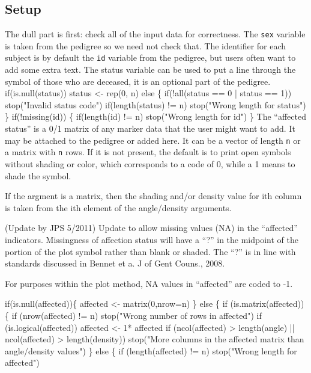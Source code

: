 \documentclass{article}
\begin{document}
\begin{enumerate}
\subsection{Setup}
The dull part is first: check all of the input data for
correctness.  
The {\tt{}sex} variable is taken from the pedigree so we need not check
that. 
The identifier for each subject is by default the {\tt{}id} variable from
the pedigree, but users often want to add some extra text.
The status variable can be used to put a line through the symbol
of those who are deceased, it is an optional part of the pedigree.
\nwenddocs{}\endmoddef
if(is.null(status))
  status <- rep(0, n)
else \{
    if(!all(status == 0 | status == 1))
      stop("Invalid status code")
    if(length(status) != n)
      stop("Wrong length for status")
\}
if(!missing(id)) \{
    if(length(id) != n)
      stop("Wrong length for id")
\}
\nwendcode{}\nwdocspar
The ``affected status'' is a 0/1 matrix of any marker data that the
user might want to add.  It may be attached to the pedigree or added
here.  It can be a vector of length {\tt{}n} or a matrix with {\tt{}n} rows.
If it is not present, the default is to print open symbols without
shading or color, which corresponds to a code of 0, while a 1 means to
shade the symbol.  

If the argment is a matrix, then the shading and/or density value for
ith column is taken from the ith element of the angle/density arguments.

(Update by JPS 5/2011) Update to allow missing values (NA) in the ``affected''
indicators.  Missingness of affection status will have a ``?'' in 
the midpoint of the portion of the plot symbol rather than blank or shaded.
The ``?'' is in line with standards discussed in 
Bennet et a. J of Gent Couns., 2008.

For purposes within the plot method, NA values in ``affected'' are coded 
to -1.

\nwenddocs{}\plusendmoddef
if(is.null(affected))\{
  affected <- matrix(0,nrow=n)
\}
else \{
    if (is.matrix(affected))\{
        if (nrow(affected) != n) stop("Wrong number of rows in affected")
        if (is.logical(affected)) affected <- 1* affected
        if (ncol(affected) > length(angle) || ncol(affected) > length(density))
            stop("More columns in the affected matrix than angle/density values")
        \} 
    else \{
        if (length(affected) != n)
        stop("Wrong length for affected")


\end{enumerate}
\end{document}
